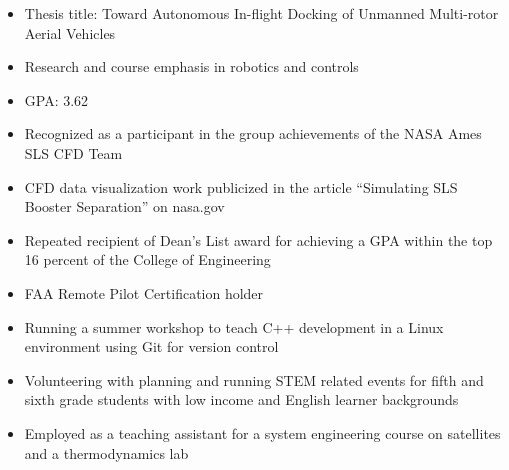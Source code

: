 
\begin{itemize}
  \item Thesis title: Toward Autonomous In-flight Docking of Unmanned Multi-rotor Aerial Vehicles
  \item Research and course emphasis in robotics and controls
  \item GPA: 3.62
\end{itemize}
\divider

\medskip
{}

\par\medskip
{}
\par\medskip
{}

\begin{itemize}
    \item Recognized as a participant in the group achievements of the NASA Ames SLS CFD Team
    \item CFD data visualization work publicized in the article “Simulating SLS Booster Separation” on nasa.gov
    \item Repeated recipient of Dean’s List award for achieving a GPA within the top 16 percent of the College of Engineering
\end{itemize}

\begin{itemize}
    \item FAA Remote Pilot Certification holder
    \item Running a summer workshop to teach C++ development in a Linux environment using Git for version control
    \item Volunteering with planning and running STEM related events for fifth and sixth grade students with low income and English learner backgrounds 
    \item Employed as a teaching assistant for a system engineering course on satellites and a thermodynamics lab
\end{itemize}